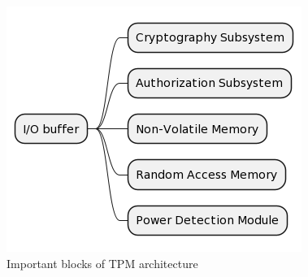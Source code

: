 \begin{figure}[H]
    \centering
    \includegraphics[width=\textwidth-6cm]{img/tpm-arch-diagram.png}
    \caption{Important blocks of TPM architecture}
    \label{fig:tpm-arch-scheme}
\end{figure}


